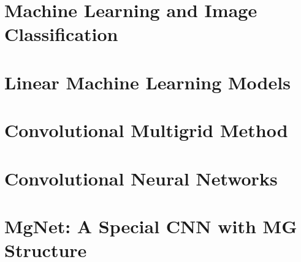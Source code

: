\chapter{Machine Learning and Image Classification} 



\chapter{Linear Machine Learning Models} 





\chapter{Convolutional Multigrid Method}
%

%
%
%
%

%







%
%




\chapter{Convolutional Neural Networks}






\chapter{MgNet: A Special CNN with MG Structure}







